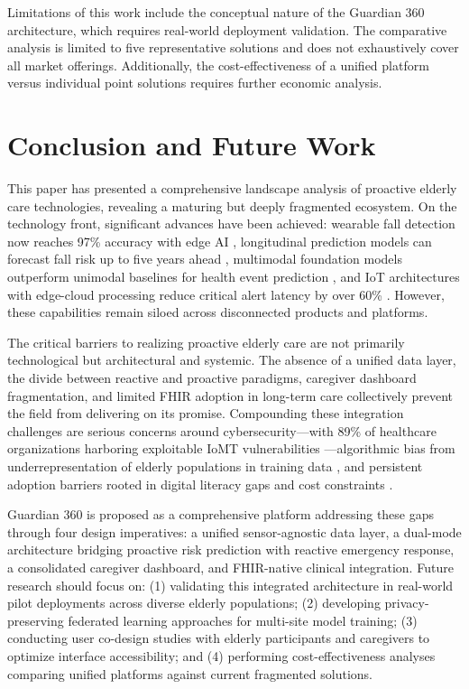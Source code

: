 \documentclass[conference]{IEEEtran}
\begin{document}
Limitations of this work include the conceptual nature of the Guardian 360 architecture, which requires real-world deployment validation. The comparative analysis is limited to five representative solutions and does not exhaustively cover all market offerings. Additionally, the cost-effectiveness of a unified platform versus individual point solutions requires further economic analysis.

\section{Conclusion and Future Work}

This paper has presented a comprehensive landscape analysis of proactive elderly care technologies, revealing a maturing but deeply fragmented ecosystem. On the technology front, significant advances have been achieved: wearable fall detection now reaches 97\% accuracy with edge AI \cite{pmc_fall_edge}, longitudinal prediction models can forecast fall risk up to five years ahead \cite{npj_fall}, multimodal foundation models outperform unimodal baselines for health event prediction \cite{arxiv_multimodal}, and IoT architectures with edge-cloud processing reduce critical alert latency by over 60\% \cite{informatica_iot}. However, these capabilities remain siloed across disconnected products and platforms.

The critical barriers to realizing proactive elderly care are not primarily technological but architectural and systemic. The absence of a unified data layer, the divide between reactive and proactive paradigms, caregiver dashboard fragmentation, and limited FHIR adoption in long-term care collectively prevent the field from delivering on its promise. Compounding these integration challenges are serious concerns around cybersecurity---with 89\% of healthcare organizations harboring exploitable IoMT vulnerabilities \cite{helpnet_cyber}---algorithmic bias from underrepresentation of elderly populations in training data \cite{frontiers_ageism}, and persistent adoption barriers rooted in digital literacy gaps and cost constraints \cite{pmc_barriers, pmc_ethics}.

Guardian 360 is proposed as a comprehensive platform addressing these gaps through four design imperatives: a unified sensor-agnostic data layer, a dual-mode architecture bridging proactive risk prediction with reactive emergency response, a consolidated caregiver dashboard, and FHIR-native clinical integration. Future research should focus on: (1) validating this integrated architecture in real-world pilot deployments across diverse elderly populations; (2) developing privacy-preserving federated learning approaches for multi-site model training; (3) conducting user co-design studies with elderly participants and caregivers to optimize interface accessibility; and (4) performing cost-effectiveness analyses comparing unified platforms against current fragmented solutions.
\end{document}
